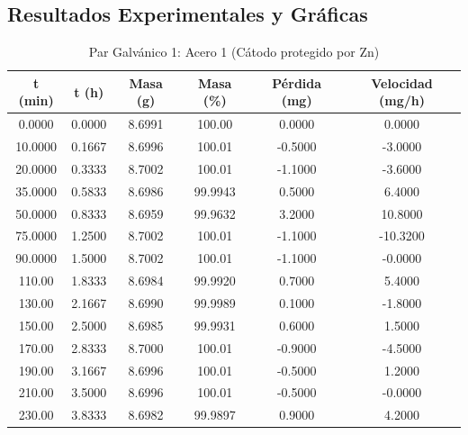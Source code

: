 \documentclass[11pt,a4paper]{article}
\begin{document}
\subsection{Resultados Experimentales y Gráficas}
\begin{table}[H]
\centering
\caption{Par Galvánico 1: Acero 1 (Cátodo protegido por Zn)}
\label{tab:3_6_acero1}
\begin{tabular}{cccccc}
\toprule
t (min) & t (h) & Masa (g) & Masa (\%) & Pérdida (mg) & Velocidad (mg/h) \\
\midrule
0.0000 & 0.0000 & 8.6991 & 100.00 & 0.0000 & 0.0000 \\
10.0000 & 0.1667 & 8.6996 & 100.01 & -0.5000 & -3.0000 \\
20.0000 & 0.3333 & 8.7002 & 100.01 & -1.1000 & -3.6000 \\
35.0000 & 0.5833 & 8.6986 & 99.9943 & 0.5000 & 6.4000 \\
50.0000 & 0.8333 & 8.6959 & 99.9632 & 3.2000 & 10.8000 \\
75.0000 & 1.2500 & 8.7002 & 100.01 & -1.1000 & -10.3200 \\
90.0000 & 1.5000 & 8.7002 & 100.01 & -1.1000 & -0.0000 \\
110.00 & 1.8333 & 8.6984 & 99.9920 & 0.7000 & 5.4000 \\
130.00 & 2.1667 & 8.6990 & 99.9989 & 0.1000 & -1.8000 \\
150.00 & 2.5000 & 8.6985 & 99.9931 & 0.6000 & 1.5000 \\
170.00 & 2.8333 & 8.7000 & 100.01 & -0.9000 & -4.5000 \\
190.00 & 3.1667 & 8.6996 & 100.01 & -0.5000 & 1.2000 \\
210.00 & 3.5000 & 8.6996 & 100.01 & -0.5000 & -0.0000 \\
230.00 & 3.8333 & 8.6982 & 99.9897 & 0.9000 & 4.2000 \\
\bottomrule
\end{tabular}
\end{table}
\end{document}
